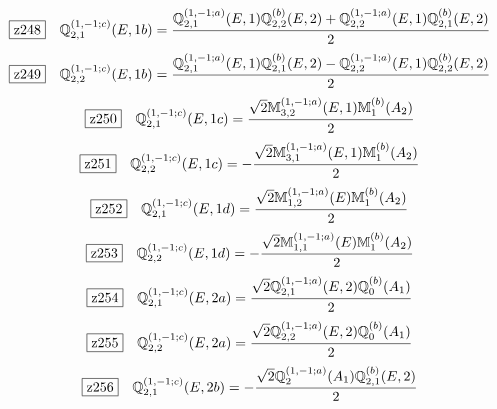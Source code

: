 \documentclass[fleqn,10pt,landscape]{jsarticle}
\begin{document}
\begin{dmath*}
\hspace*{3mm}\fbox{z248}\quad \mathbb{Q}_{2,1}^{(1,-1;c)}(E,1b)=\frac{\mathbb{Q}_{2,1}^{(1,-1;a)}(E,1) \mathbb{Q}_{2,2}^{(b)}(E,2) + \mathbb{Q}_{2,2}^{(1,-1;a)}(E,1) \mathbb{Q}_{2,1}^{(b)}(E,2)}{2}
\end{dmath*}
\begin{dmath*}
\hspace*{3mm}\fbox{z249}\quad \mathbb{Q}_{2,2}^{(1,-1;c)}(E,1b)=\frac{\mathbb{Q}_{2,1}^{(1,-1;a)}(E,1) \mathbb{Q}_{2,1}^{(b)}(E,2) - \mathbb{Q}_{2,2}^{(1,-1;a)}(E,1) \mathbb{Q}_{2,2}^{(b)}(E,2)}{2}
\end{dmath*}
\begin{dmath*}
\hspace*{3mm}\fbox{z250}\quad \mathbb{Q}_{2,1}^{(1,-1;c)}(E,1c)=\frac{\sqrt{2} \mathbb{M}_{3,2}^{(1,-1;a)}(E,1) \mathbb{M}_{1}^{(b)}(A_{2})}{2}
\end{dmath*}
\begin{dmath*}
\hspace*{3mm}\fbox{z251}\quad \mathbb{Q}_{2,2}^{(1,-1;c)}(E,1c)=- \frac{\sqrt{2} \mathbb{M}_{3,1}^{(1,-1;a)}(E,1) \mathbb{M}_{1}^{(b)}(A_{2})}{2}
\end{dmath*}
\begin{dmath*}
\hspace*{3mm}\fbox{z252}\quad \mathbb{Q}_{2,1}^{(1,-1;c)}(E,1d)=\frac{\sqrt{2} \mathbb{M}_{1,2}^{(1,-1;a)}(E) \mathbb{M}_{1}^{(b)}(A_{2})}{2}
\end{dmath*}
\begin{dmath*}
\hspace*{3mm}\fbox{z253}\quad \mathbb{Q}_{2,2}^{(1,-1;c)}(E,1d)=- \frac{\sqrt{2} \mathbb{M}_{1,1}^{(1,-1;a)}(E) \mathbb{M}_{1}^{(b)}(A_{2})}{2}
\end{dmath*}
\begin{dmath*}
\hspace*{3mm}\fbox{z254}\quad \mathbb{Q}_{2,1}^{(1,-1;c)}(E,2a)=\frac{\sqrt{2} \mathbb{Q}_{2,1}^{(1,-1;a)}(E,2) \mathbb{Q}_{0}^{(b)}(A_{1})}{2}
\end{dmath*}
\begin{dmath*}
\hspace*{3mm}\fbox{z255}\quad \mathbb{Q}_{2,2}^{(1,-1;c)}(E,2a)=\frac{\sqrt{2} \mathbb{Q}_{2,2}^{(1,-1;a)}(E,2) \mathbb{Q}_{0}^{(b)}(A_{1})}{2}
\end{dmath*}
\begin{dmath*}
\hspace*{3mm}\fbox{z256}\quad \mathbb{Q}_{2,1}^{(1,-1;c)}(E,2b)=- \frac{\sqrt{2} \mathbb{Q}_{2}^{(1,-1;a)}(A_{1}) \mathbb{Q}_{2,1}^{(b)}(E,2)}{2}
\end{dmath*}
\end{document}
